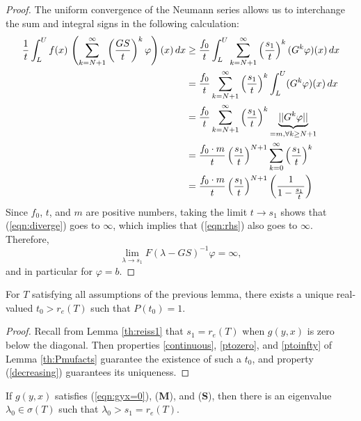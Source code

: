 \begin{proof}
	The uniform convergence of the Neumann series allows us to interchange the sum and integral signs in the following calculation:
	\begin{align}
		\frac{1}{t} \int_L^U f(x) \, \left( \sum_{k=N+1}^\infty \left( \frac{GS}{t} \right)^k \varphi \right)(x) \, dx &\geq \frac{f_0}{t} \int_L^U  \sum_{k=N+1}^\infty \left( \frac{s_1}{t} \right)^k (G^k\varphi)(x) \, dx \notag \\
		&= \frac{f_0}{t}\sum_{k=N+1}^\infty \left( \frac{s_1}{t} \right)^k \int_L^U (G^k\varphi)(x) \, dx \notag \\
		&= \frac{f_0}{t} \sum_{k=N+1}^\infty \left( \frac{s_1}{t} \right)^k \underbrace{||G^k \varphi||}_{=m, \forall k \geq N +1} \notag \\
		&= \frac{f_0 \cdot m}{t} \left(\frac{s_1}{t}\right)^{N+1} \sum_{k=0}^\infty \left( \frac{s_1}{t} \right)^k \notag \\
		&= \frac{f_0 \cdot m}{t} \left(\frac{s_1}{t}\right)^{N+1} \left( \frac{1}{1-\frac{s_1}{t}} \right) \label{eqn:diverge}
	\end{align}
	Since $f_0$, $t$, and $m$ are positive numbers, taking the limit $t \to s_1$ shows that  (\ref{eqn:diverge}) goes to $\infty$, which implies that (\ref{eqn:rhs}) also goes to $\infty$. Therefore, 
	\[\lim_{\lambda \to s_1} F(\lambda-GS)^{-1} \varphi = \infty,\]
	and in particular for $\varphi = b$.
	
\end{proof}

\begin{corollary} \label{th:Pis1}
	For $T$ satisfying all assumptions of the previous lemma, there exists a unique real-valued $t_0 > r_e(T)$ such that $P(t_0) = 1$.
\end{corollary}

\begin{proof}
	Recall from Lemma \ref{th:reiss1} that $s_1 = r_e(T)$ when $g(y,x)$ is zero below the diagonal. Then properties \eqref{continuous}, \eqref{ptozero}, and \eqref{ptoinfty} of Lemma \ref{th:Pmufacts} guarantee the existence of such a $t_0$, and property (\ref{decreasing}) guarantees its uniqueness.
	
\end{proof}

\begin{lemma} \label{th:thereisamu}
	If $g(y, x)$ satisfies (\ref{eqn:gyx=0}), (\textbf{M}), and (\textbf{S}), then there is an eigenvalue $\lambda_0 \in \sigma(T)$ such that $\lambda_0 > s_1 = r_e(T)$.
\end{lemma}

